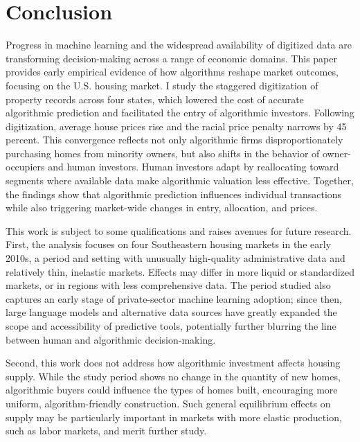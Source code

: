 \documentclass[11pt]{article}
\begin{document}
\section{Conclusion}
Progress in machine learning and the widespread availability of digitized data are transforming decision-making across a range of economic domains. This paper provides early empirical evidence of how algorithms reshape market outcomes, focusing on the U.S. housing market. I study the staggered digitization of property records across four states, which lowered the cost of accurate algorithmic prediction and facilitated the entry of algorithmic investors. Following digitization, average house prices rise and the racial price penalty narrows by 45 percent. This convergence reflects not only algorithmic firms disproportionately purchasing homes from minority owners, but also shifts in the behavior of owner-occupiers and human investors. Human investors adapt by reallocating toward segments where available data make algorithmic valuation less effective. Together, the findings show that algorithmic prediction influences individual transactions while also triggering market-wide changes in entry, allocation, and prices.

This work is subject to some qualifications and raises avenues for future research. First, the analysis focuses on four Southeastern housing markets in the early 2010s, a period and setting with unusually high-quality administrative data and relatively thin, inelastic markets. Effects may differ in more liquid or standardized markets, or in regions with less comprehensive data. The period studied also captures an early stage of private-sector machine learning adoption; since then, large language models and alternative data sources have greatly expanded the scope and accessibility of predictive tools, potentially further blurring the line between human and algorithmic decision-making.

Second, this work does not address how algorithmic investment affects housing supply. While the study period shows no change in the quantity of new homes, algorithmic buyers could influence the types of homes built, encouraging more uniform, algorithm-friendly construction. Such general equilibrium effects on supply may be particularly important in markets with more elastic production, such as labor markets, and merit further study.
\end{document}
